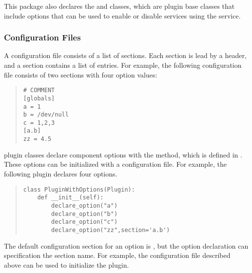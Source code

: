This package also declares the  and 
classes, which are plugin base classes that include options that can be
used to enable or disable services using the  service. 


\subsubsection{Configuration Files}

A \pcasp configuration file consists of a list of sections.  Each section is lead by a \code{[section]} header, and a section contains a list of  entries.  For example, 
the following configuration file consists of two sections with four option values:
\begin{quotation}
\begin{lstlisting}
# COMMENT
[globals]
a = 1
b = /dev/null
c = 1,2,3
[a.b]
zz = 4.5
\end{lstlisting}
\end{quotation}
\pcasp plugin classes declare component options with the  method, which is defined in
.
These options can be initialized with a configuration file.  For example, the following plugin
declares four options.  
\begin{quotation}
\begin{lstlisting}
class PluginWithOptions(Plugin):
    def __init__(self):
        declare_option("a")
        declare_option("b")
        declare_option("c")
        declare_option("zz",section='a.b')
\end{lstlisting}
\end{quotation}
The default configuration section for an option is \code{[globals]},
but the option declaration can specification the section name.  For example, the configuration file
described above can be used to initialize the  plugin.

